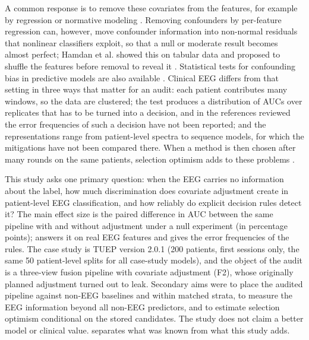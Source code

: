 A common response is to remove these covariates from the features, for example by regression or normative modeling \cite{rutherford2022,rutherford2023,bayer2022neuroimage}.
Removing confounders by per-feature regression can, however, move confounder information into non-normal residuals that nonlinear classifiers exploit, so that a null or moderate result becomes almost perfect; Hamdan et al. showed this on tabular data and proposed to shuffle the features before removal to reveal it \cite{hamdan2023}. Statistical tests for confounding bias in predictive models are also available \cite{spisak2022}.
Clinical EEG differs from that setting in three ways that matter for an audit: each patient contributes many windows, so the data are clustered; the test produces a distribution of AUCs over replicates that has to be turned into a decision, and in the references reviewed the error frequencies of such a decision have not been reported; and the representations range from patient-level spectra to sequence models, for which the mitigations have not been compared there.
When a method is then chosen after many rounds on the same patients, selection optimism adds to these problems \cite{varma2006}.

This study asks one primary question: when the EEG carries no information about the label, how much discrimination does covariate adjustment create in patient-level EEG classification, and how reliably do explicit decision rules detect it?
The main effect size is the paired difference in AUC between the same pipeline with and without adjustment under a null experiment (in percentage points);  answers it on real EEG features and  gives the error frequencies of the rules.
The case study is TUEP version 2.0.1 (200 patients, first sessions only, the same 50 patient-level splits for all case-study models), and the object of the audit is a three-view fusion pipeline with covariate adjustment (F2), whose originally planned adjustment turned out to leak.
Secondary aims were to place the audited pipeline against non-EEG baselines and within matched strata, to measure the EEG information beyond all non-EEG predictors, and to estimate selection optimism conditional on the stored candidates. The study does not claim a better model or clinical value.
 separates what was known from what this study adds.


